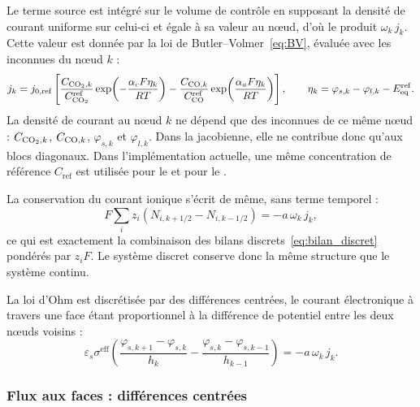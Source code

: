 Le terme source est intégré sur le volume de contrôle en supposant la densité
de courant uniforme sur celui-ci et égale à sa valeur au nœud, d'où le
produit $\omega_k\, j_k$. Cette valeur est donnée par la loi de
Butler--Volmer~\eqref{eq:BV}, évaluée avec les inconnues du nœud $k$ :
\begin{equation}
j_k = j_{0,\mathrm{ref}}
\left[
\frac{C_{\ce{CO2},k}}{C_{\ce{CO2}}^{\mathrm{ref}}}
\exp\!\left(-\frac{\alpha_c F \eta_k}{RT}\right)
-
\frac{C_{\ce{CO},k}}{C_{\ce{CO}}^{\mathrm{ref}}}
\exp\!\left(\frac{\alpha_a F \eta_k}{RT}\right)
\right],
\qquad
\eta_k = \varphi_{s,k} - \varphi_{l,k} - E_{\mathrm{eq}}^{\mathrm{ref}} .
\label{eq:BV_discret}
\end{equation}
La densité de courant au nœud $k$ ne dépend que des inconnues de ce même
nœud : $C_{\ce{CO2},k}$, $C_{\ce{CO},k}$, $\varphi_{s,k}$ et $\varphi_{l,k}$.
Dans la jacobienne, elle ne contribue donc qu'aux blocs diagonaux. Dans
l'implémentation actuelle, une même concentration de référence $C_{\mathrm{ref}}$
est utilisée pour le  et pour le .

La conservation du courant ionique s'écrit de même, sans terme temporel :
\begin{equation}
F\sum_i z_i\left(N_{i,k+1/2} - N_{i,k-1/2}\right) = -a\, \omega_k\, j_k ,
\label{eq:charge_discret}
\end{equation}
ce qui est exactement la combinaison des bilans
discrets~\eqref{eq:bilan_discret} pondérés par $z_iF$. Le système discret
conserve donc la même structure que le système continu.

La loi d'Ohm est discrétisée par des différences centrées, le courant
électronique à travers une face étant proportionnel à la différence de
potentiel entre les deux nœuds voisins :
\begin{equation}
\varepsilon_s\sigma^{\mathrm{eff}}
\left(
\frac{\varphi_{s,k+1} - \varphi_{s,k}}{h_k}
-
\frac{\varphi_{s,k} - \varphi_{s,k-1}}{h_{k-1}}
\right)
= -a\, \omega_k\, j_k .
\label{eq:ohm_discret}
\end{equation}

\subsubsection*{Flux aux faces : différences centrées}

